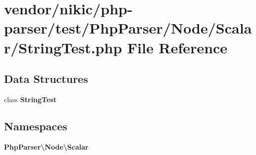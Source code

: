 \section{vendor/nikic/php-\/parser/test/\+Php\+Parser/\+Node/\+Scalar/\+String\+Test.php File Reference}
\label{nikic_2php-parser_2test_2_php_parser_2_node_2_scalar_2_string_test_8php}
\subsection*{Data Structures}
\begin{DoxyCompactItemize}
\item 
class {\bf String\+Test}
\end{DoxyCompactItemize}
\subsection*{Namespaces}
\begin{DoxyCompactItemize}
\item 
 {\bf Php\+Parser\textbackslash{}\+Node\textbackslash{}\+Scalar}
\end{DoxyCompactItemize}
